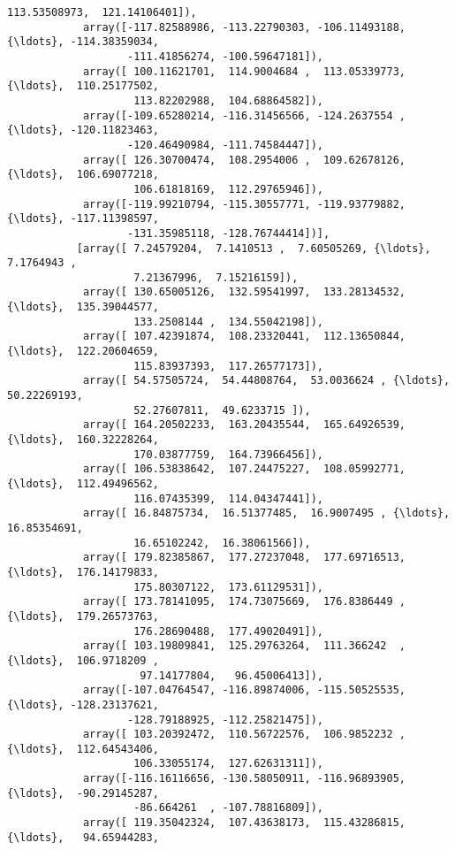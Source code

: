\documentclass[11pt]{article}
\begin{document}
\begin{Verbatim}[commandchars=\\\{\}]
                    113.53508973,  121.14106401]),
            array([-117.82588986, -113.22790303, -106.11493188, {\ldots}, -114.38359034,
                   -111.41856274, -100.59647181]),
            array([ 100.11621701,  114.9004684 ,  113.05339773, {\ldots},  110.25177502,
                    113.82202988,  104.68864582]),
            array([-109.65280214, -116.31456566, -124.2637554 , {\ldots}, -120.11823463,
                   -120.46490984, -111.74584447]),
            array([ 126.30700474,  108.2954006 ,  109.62678126, {\ldots},  106.69077218,
                    106.61818169,  112.29765946]),
            array([-119.99210794, -115.30557771, -119.93779882, {\ldots}, -117.11398597,
                   -131.35985118, -128.76744414])],
           [array([ 7.24579204,  7.1410513 ,  7.60505269, {\ldots},  7.1764943 ,
                    7.21367996,  7.15216159]),
            array([ 130.65005126,  132.59541997,  133.28134532, {\ldots},  135.39044577,
                    133.2508144 ,  134.55042198]),
            array([ 107.42391874,  108.23320441,  112.13650844, {\ldots},  122.20604659,
                    115.83937393,  117.26577173]),
            array([ 54.57505724,  54.44808764,  53.0036624 , {\ldots},  50.22269193,
                    52.27607811,  49.6233715 ]),
            array([ 164.20502233,  163.20435544,  165.64926539, {\ldots},  160.32228264,
                    170.03877759,  164.73966456]),
            array([ 106.53838642,  107.24475227,  108.05992771, {\ldots},  112.49496562,
                    116.07435399,  114.04347441]),
            array([ 16.84875734,  16.51377485,  16.9007495 , {\ldots},  16.85354691,
                    16.65102242,  16.38061566]),
            array([ 179.82385867,  177.27237048,  177.69716513, {\ldots},  176.14179833,
                    175.80307122,  173.61129531]),
            array([ 173.78141095,  174.73075669,  176.8386449 , {\ldots},  179.26573763,
                    176.28690488,  177.49020491]),
            array([ 103.19809841,  125.29763264,  111.366242  , {\ldots},  106.9718209 ,
                     97.14177804,   96.45006413]),
            array([-107.04764547, -116.89874006, -115.50525535, {\ldots}, -128.23137621,
                   -128.79188925, -112.25821475]),
            array([ 103.20392472,  110.56722576,  106.9852232 , {\ldots},  112.64543406,
                    106.33055174,  127.62631311]),
            array([-116.16116656, -130.58050911, -116.96893905, {\ldots},  -90.29145287,
                    -86.664261  , -107.78816809]),
            array([ 119.35042324,  107.43638173,  115.43286815, {\ldots},   94.65944283,

\end{Verbatim}
\end{document}
